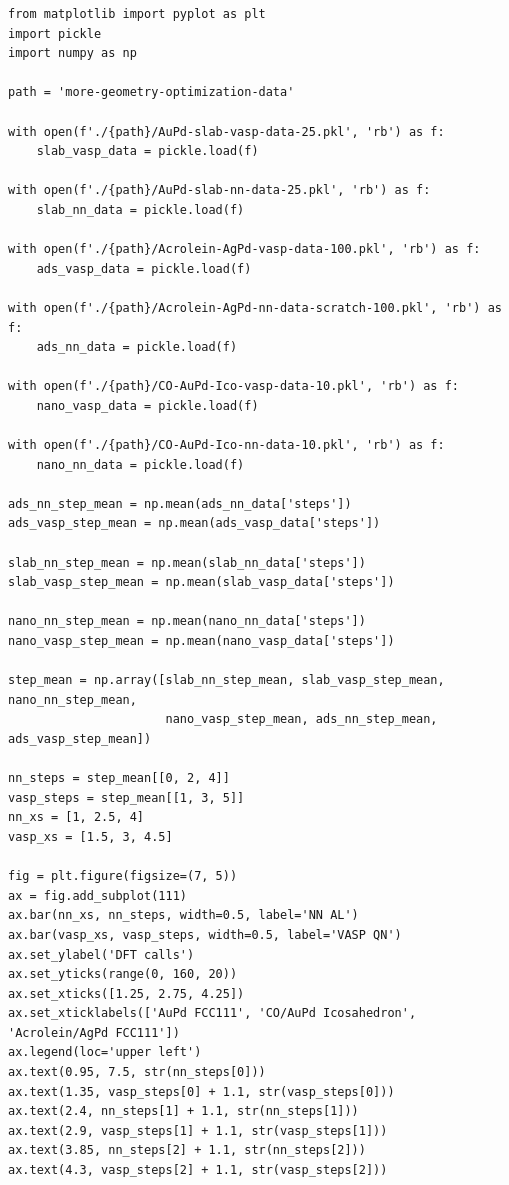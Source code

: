 \documentclass[aps,prl,citeautoscript,preprint,citeautoscript,showkeys]{revtex4-1}
\begin{document}
\begin{verbatim}
from matplotlib import pyplot as plt
import pickle
import numpy as np

path = 'more-geometry-optimization-data'

with open(f'./{path}/AuPd-slab-vasp-data-25.pkl', 'rb') as f:
    slab_vasp_data = pickle.load(f)

with open(f'./{path}/AuPd-slab-nn-data-25.pkl', 'rb') as f:
    slab_nn_data = pickle.load(f)

with open(f'./{path}/Acrolein-AgPd-vasp-data-100.pkl', 'rb') as f:
    ads_vasp_data = pickle.load(f)

with open(f'./{path}/Acrolein-AgPd-nn-data-scratch-100.pkl', 'rb') as f:
    ads_nn_data = pickle.load(f)

with open(f'./{path}/CO-AuPd-Ico-vasp-data-10.pkl', 'rb') as f:
    nano_vasp_data = pickle.load(f)

with open(f'./{path}/CO-AuPd-Ico-nn-data-10.pkl', 'rb') as f:
    nano_nn_data = pickle.load(f)

ads_nn_step_mean = np.mean(ads_nn_data['steps'])
ads_vasp_step_mean = np.mean(ads_vasp_data['steps'])

slab_nn_step_mean = np.mean(slab_nn_data['steps'])
slab_vasp_step_mean = np.mean(slab_vasp_data['steps'])

nano_nn_step_mean = np.mean(nano_nn_data['steps'])
nano_vasp_step_mean = np.mean(nano_vasp_data['steps'])

step_mean = np.array([slab_nn_step_mean, slab_vasp_step_mean, nano_nn_step_mean,
                      nano_vasp_step_mean, ads_nn_step_mean, ads_vasp_step_mean])

nn_steps = step_mean[[0, 2, 4]]
vasp_steps = step_mean[[1, 3, 5]]
nn_xs = [1, 2.5, 4]
vasp_xs = [1.5, 3, 4.5]

fig = plt.figure(figsize=(7, 5))
ax = fig.add_subplot(111)
ax.bar(nn_xs, nn_steps, width=0.5, label='NN AL')
ax.bar(vasp_xs, vasp_steps, width=0.5, label='VASP QN')
ax.set_ylabel('DFT calls')
ax.set_yticks(range(0, 160, 20))
ax.set_xticks([1.25, 2.75, 4.25])
ax.set_xticklabels(['AuPd FCC111', 'CO/AuPd Icosahedron', 'Acrolein/AgPd FCC111'])
ax.legend(loc='upper left')
ax.text(0.95, 7.5, str(nn_steps[0]))
ax.text(1.35, vasp_steps[0] + 1.1, str(vasp_steps[0]))
ax.text(2.4, nn_steps[1] + 1.1, str(nn_steps[1]))
ax.text(2.9, vasp_steps[1] + 1.1, str(vasp_steps[1]))
ax.text(3.85, nn_steps[2] + 1.1, str(nn_steps[2]))
ax.text(4.3, vasp_steps[2] + 1.1, str(vasp_steps[2]))
\end{verbatim}
\end{document}
